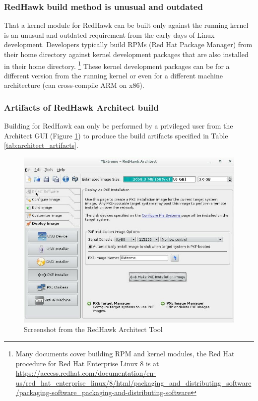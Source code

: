 \documentclass[12pt]{article}
\begin{document}
\subsubsection{RedHawk build method is unusual and outdated}
That a kernel module for RedHawk can be built only against the running kernel is
an unusual and outdated requirement from the early days of Linux development.
Developers typically build RPMs (Red Hat Package Manager) from their home
directory against kernel development packages that are also installed in their
home directory.%
\footnote{Many documents cover building RPM and kernel modules,
the Red Hat procedure for Red Hat Enterprise Linux 8 is at
\url{https://access.redhat.com/documentation/en-us/red_hat_enterprise_linux/8/html/packaging_and_distributing_software/packaging-software_packaging-and-distributing-software}}%
These kernel development packages can be for a different version from the
running kernel or even for a different machine architecture (can cross-compile
ARM on x86).


\subsubsection{Artifacts of RedHawk Architect build}
Building for RedHawk can only be performed by a privileged user from the
Architect GUI (Figure \ref{fig:architect_screenshot}) to produce the build
artifacts specified in Table \ref{tab:architect_artifacts}.

\begin{figure}[H]
    \begin{center}
    \includegraphics[width=1.0\textwidth]{img/architect_screenshot}
    \caption{Screenshot from the RedHawk Architect Tool}
    \label{fig:architect_screenshot}
    \end{center}
\end{figure}
\end{document}
